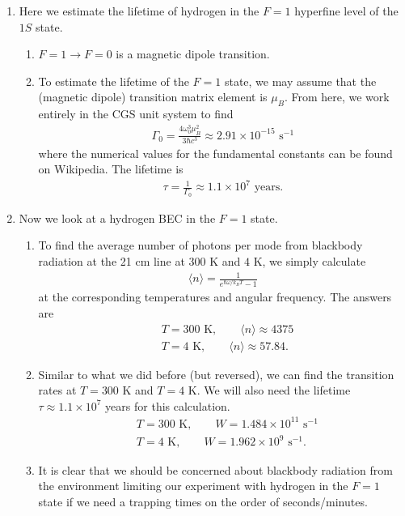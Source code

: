 \documentclass{article}
\theoremstyle{definition}
\newcommand{\f}[2]{\frac{#1}{#2}}
\begin{document}
\begin{enumerate}[label=(\alph*)]
	\item Here we estimate the lifetime of hydrogen in the $F=1$ hyperfine level of the $1S$ state. 
	
	\begin{enumerate}[label=(\roman*)]
		\item $F=1 \to F=0$ is a magnetic dipole transition. 
		
		\item To estimate the lifetime of the $F=1$ state, we may assume that the (magnetic dipole) transition matrix element is $\mu_B$. From here, we work entirely in the CGS unit system to find 
		\begin{align*}
		\Gamma_0 = \f{4\omega_0^3 \mu_B^2}{3\hbar c^3} \approx 2.91 \times 10^{-15} \text{ s}^{-1}
		\end{align*}
		where the numerical values for the fundamental constants can be found on Wikipedia. The lifetime is 
		\begin{align*}
		\tau = \f{1}{\Gamma_0} \approx 1.1 \times 10^7 \text{ years}.
		\end{align*}
		
		
	\end{enumerate}
	
	\item Now we look at a hydrogen BEC in the $F=1$ state. 
	
	\begin{enumerate}[label=(\roman*)]
		\item To find the average number of photons per mode from blackbody radiation at the 21 cm line at $300$ K and $4$ K, we simply calculate
		\begin{align*}
		\langle n \rangle = \f{1}{e^{\hbar \omega/k_B T} - 1}
		\end{align*}
		at the corresponding temperatures and angular frequency. The answers are
		\begin{align*}
		&T = 300 \text{ K}, \quad\quad \langle n \rangle \approx 4375 \\
		&T = 4 \text{ K}, \quad\quad \langle n \rangle \approx 57.84.
		\end{align*}
		
		\item Similar to what we did before (but reversed), we can find the transition rates at $T=300$ K and $T = 4$ K. We will also need the lifetime $\tau \approx 1.1 \times 10^7 $ years for this calculation.
		\begin{align*}
		&T = 300 \text{ K}, \quad\quad W = 1.484\times 10^{11} \text{ s}^{-1}\\
		&T = 4 \text{ K}, \quad\quad W = 1.962 \times 10^9 \text{ s}^{-1}.
		\end{align*}
		\item It is clear that we should be concerned about blackbody radiation from the environment limiting our experiment with hydrogen in the $F=1$ state if we need a trapping times on the order of seconds/minutes. 


\end{enumerate}
\end{enumerate}
\end{document}
